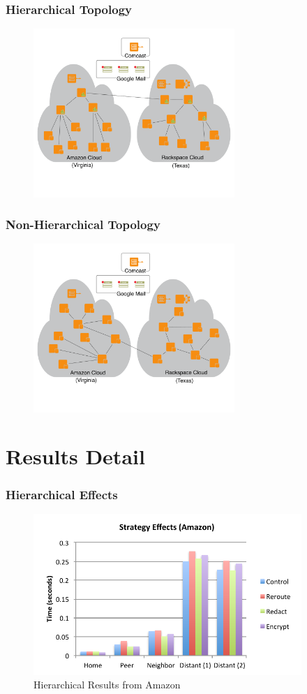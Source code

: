 \documentclass[t,handout]{beamer}
\begin{document}
\begin{frame}
\frametitle{Hierarchical Topology}
\begin{figure}[!t]
\centering
\includegraphics[width=3in]{hierarchical-clouds}
\end{figure}
\end{frame}

\begin{frame}
\frametitle{Non-Hierarchical Topology}
\begin{figure}[!t]
\centering
\includegraphics[width=3in]{non-hierarchical-clouds}
\end{figure}
\end{frame}

\section{Results Detail}

\begin{frame}
\frametitle{Hierarchical Effects}
\begin{figure}[!t]
\centering
\includegraphics[width=4in]{strategy_effects_az}
\caption{Hierarchical Results from Amazon}
\end{figure}
\end{frame}
\end{document}
